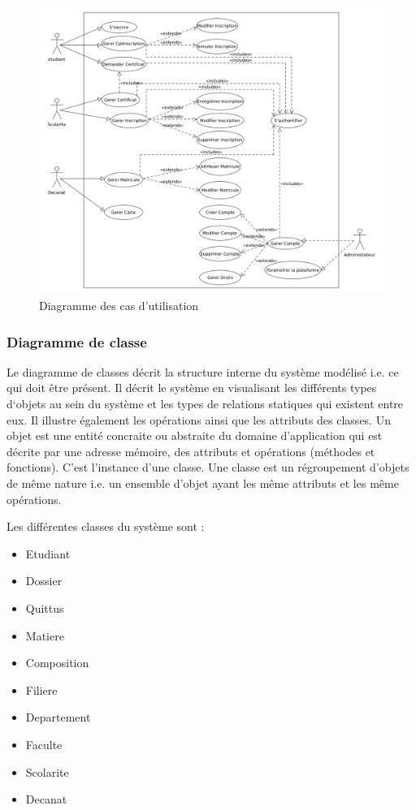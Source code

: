 \documentclass[12pt,a4paper]{article}
\begin{document}
	\begin{figure}[H]
		\centering
		\includegraphics[width=\textwidth]{./images/use_case_diag}
		\caption{Diagramme des cas d'utilisation}
		\label{fig:figure3}
	\end{figure}


	\subsubsection{Diagramme de classe}
	Le diagramme de classes décrit la structure interne du système
	modélisé i.e. ce qui doit être présent. Il décrit le système en
	visualisant les différents types d‘objets au sein du système et
	les types de relations statiques qui existent entre eux. Il illustre
	également les opérations ainsi que les attributs des classes. Un objet est une entité concraite ou abstraite du domaine
	d’application qui est décrite par une adresse mémoire, des
	attributs et opérations (méthodes et fonctions). C’est
	l’instance d’une classe. Une classe est un régroupement d’objets de même nature i.e.	un ensemble d’objet ayant les même attributs et les même
	opérations.
		
	Les différentes classes du système sont :
	\begin{itemize}
		\item Etudiant
		\item Dossier
		\item Quittus
		\item Matiere
		\item Composition
		\item Filiere
		\item Departement
		\item Faculte
		\item Scolarite
		\item Decanat
	\end{itemize}
	
\end{document}

